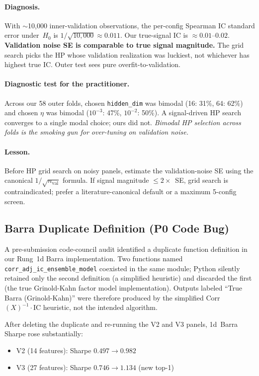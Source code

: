\documentclass[11pt]{article}
\begin{document}
\paragraph{Diagnosis.}
With $\sim$10{,}000 inner-validation observations, the per-config
Spearman IC standard error under~$H_0$ is
$1/\sqrt{10{,}000} \approx 0.011$. Our true-signal IC is $\approx
0.01$--$0.02$. \textbf{Validation noise SE is comparable to true signal
magnitude.} The grid search picks the HP whose validation realization
was luckiest, not whichever has highest true IC. Outer test sees pure
overfit-to-validation.

\paragraph{Diagnostic test for the practitioner.}
Across our 58 outer folds, chosen \texttt{hidden\_dim} was bimodal
(16: 31\%, 64: 62\%) and chosen $\eta$ was bimodal ($10^{-3}$: 47\%,
$10^{-2}$: 50\%). A signal-driven HP search converges to a single
modal choice; ours did not. \emph{Bimodal HP selection across folds
is the smoking gun for over-tuning on validation noise.}

\paragraph{Lesson.}
Before HP grid search on noisy panels, estimate the validation-noise
SE using the canonical $1/\sqrt{n_{\text{val}}}$ formula. If signal
magnitude $\le 2\times$~SE, grid search is contraindicated; prefer a
literature-canonical default or a maximum 5-config screen.

\subsection{Barra Duplicate Definition (P0 Code Bug)}\label{subsec:barra-fix}

A pre-submission code-council audit identified a duplicate function
definition in our Rung~1d Barra implementation. Two functions named
\texttt{corr\_adj\_ic\_ensemble\_model} coexisted in the same module;
Python silently retained only the second definition (a simplified
heuristic) and discarded the first (the true Grinold-Kahn factor model
implementation). Outputs labeled ``True Barra (Grinold-Kahn)'' were
therefore produced by the simplified Corr$(X)^{-1}\cdot\text{IC}$
heuristic, not the intended algorithm.

After deleting the duplicate and re-running the V2 and V3 panels,
1d~Barra Sharpe rose substantially:
\begin{itemize}[leftmargin=2em,topsep=2pt,itemsep=2pt]
\item V2 (14 features): Sharpe $0.497 \to 0.982$
\item V3 (27 features): Sharpe $0.746 \to \mathbf{1.134}$ (new top-1)
\end{itemize}
\end{document}
